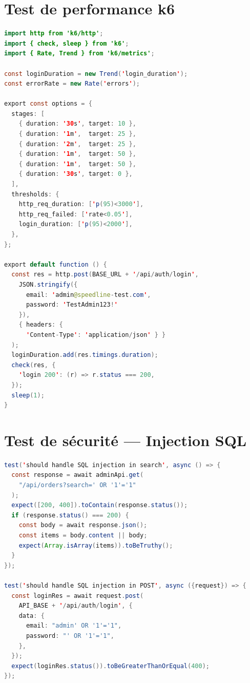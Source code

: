 \section{Test de performance k6}

\begin{lstlisting}[language=Java, caption={k6-load-test.js --- Test de charge}, label={lst:k6-load}]
import http from 'k6/http';
import { check, sleep } from 'k6';
import { Rate, Trend } from 'k6/metrics';

const loginDuration = new Trend('login_duration');
const errorRate = new Rate('errors');

export const options = {
  stages: [
    { duration: '30s', target: 10 },
    { duration: '1m',  target: 25 },
    { duration: '2m',  target: 25 },
    { duration: '1m',  target: 50 },
    { duration: '1m',  target: 50 },
    { duration: '30s', target: 0 },
  ],
  thresholds: {
    http_req_duration: ['p(95)<3000'],
    http_req_failed: ['rate<0.05'],
    login_duration: ['p(95)<2000'],
  },
};

export default function () {
  const res = http.post(BASE_URL + '/api/auth/login',
    JSON.stringify({
      email: 'admin@speedline-test.com',
      password: 'TestAdmin123!'
    }),
    { headers: {
      'Content-Type': 'application/json' } }
  );
  loginDuration.add(res.timings.duration);
  check(res, {
    'login 200': (r) => r.status === 200,
  });
  sleep(1);
}
\end{lstlisting}

\section{Test de sécurité --- Injection SQL}

\begin{lstlisting}[language=Java, caption={security.api.spec.ts --- Test d'injection SQL}, label={lst:security}]
test('should handle SQL injection in search', async () => {
  const response = await adminApi.get(
    "/api/orders?search=' OR '1'='1"
  );
  expect([200, 400]).toContain(response.status());
  if (response.status() === 200) {
    const body = await response.json();
    const items = body.content || body;
    expect(Array.isArray(items)).toBeTruthy();
  }
});

test('should handle SQL injection in POST', async ({request}) => {
  const loginRes = await request.post(
    API_BASE + '/api/auth/login', {
    data: {
      email: "admin' OR '1'='1",
      password: "' OR '1'='1",
    },
  });
  expect(loginRes.status()).toBeGreaterThanOrEqual(400);
});
\end{lstlisting}
